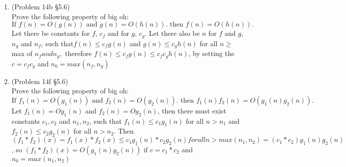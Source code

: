 \documentclass[12pt]{article}
\begin{document}
\begin{enumerate}
\begin{enumerate}[a.]
\end{enumerate}






\item (Problem 14b \S 5.6)\\
Prove the following property of big oh:
\[\text{If }f(n)=O(g(n))\text{ and } g(n)=O(h(n)).\text{ then } f(n)=O(h(n)).\]
\proof
Let there be constants for $f$, $c_f$ and for $g$, $c_g$. Let there also be $n$ for $f$ and $g$, $n_g$ and $n_f$, such that$f(n) \leq c_fg(n)$ and $g(n) \leq c_gh(n)$ for all $n \geq$ max of $n_f and n_g,$ therefore $f(n) \leq c_fg(n) \leq c_fc_gh(n)$, by setting the $c=c_fc_g$ and $n_0=max(n_f,n_g)$  
\endproof




\item (Problem 14f \S 5.6)\\
Prove the following property of big oh:
\[\text{If }f_1(n)=O(g_1(n))\text{ and } f_2(n)=O(g_2(n)).\text{ then } f_1(n)f_2(n)=O(g_1(n)g_2(n)).\]
\proof
Let $f_1(n)=Og_1(n)$ and $f_2(n)=Og_2(n)$, then there must exist constants $c_{1},c_{2}$ and $n_1, n_2$, such that $f_1(n)\leq c_{1}g_1(n)$ for all $n > n_1$ and $f_2(n)\leq c_{2}g_2(n)$ for all $n > n_2$. Then $(f_1*f_2)(x)=f_1(x)*f_2(x) \leq c_1g_1(n)*c_2g_2(n) for all n > max(n_1,n_2) = (c_1*c_2)g_1(n)g_2(n)$, so $(f_1*f_2)(x)=O(g_1(n)g_2(n))$ if $c = c_1*c_2$ and $n_0 = max(n_1,n_2)$
\endproof




\end{enumerate}
\end{document}
